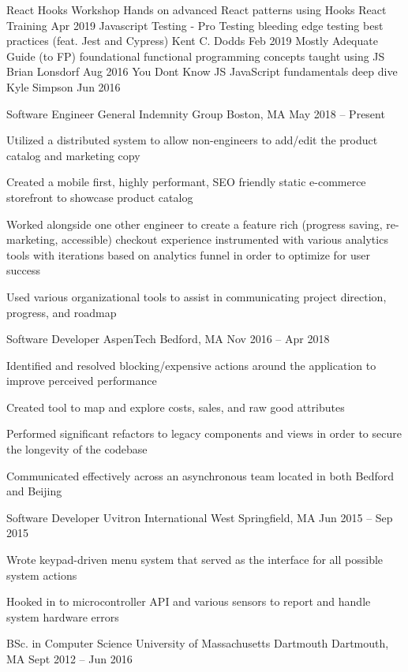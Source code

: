 \documentclass[]{awesome-cv}
\begin{document}
\vspace{-7mm}
\begin{cvhonors}
	\cvhonor
	{React Hooks Workshop}
	{Hands on advanced React patterns using Hooks}
	{React Training}
	{Apr 2019}
	\cvhonor
	{Javascript Testing - Pro Testing}
	{bleeding edge testing best practices (feat. Jest and Cypress)}
	{Kent C. Dodds}
	{Feb 2019}
	\cvhonor
	{Mostly Adequate Guide (to FP)}
	{foundational functional programming concepts taught using JS}
	{Brian Lonsdorf}
	{Aug 2016}
	\cvhonor
	{You Don\textquotesingle{}t Know JS}
	{JavaScript fundamentals deep dive}
	{Kyle Simpson}
	{Jun 2016}
\end{cvhonors}
\begin{cventries}
	\cventry
	{Software Engineer}
	{General Indemnity Group}
	{Boston, MA}
	{May 2018 – Present}
	{\begin{cvitems}
		\item {Utilized a distributed system to allow non-engineers to add/edit the product catalog and marketing copy}
		\item {Created a mobile first, highly performant, SEO friendly static e-commerce storefront to showcase product catalog}
		\item {Worked alongside one other engineer to create a feature rich (progress saving, re-marketing, accessible) checkout experience instrumented with various analytics tools with iterations based on analytics funnel in order to optimize for user success}
		\item {Used various organizational tools to assist in communicating project direction, progress, and roadmap}
		\end{cvitems}}
	\cventry
	{Software Developer}
	{AspenTech}
	{Bedford, MA}
	{Nov 2016 – Apr 2018}
	{\begin{cvitems}
		\item {Identified and resolved blocking/expensive actions around the application to improve perceived performance}
		\item {Created tool to map and explore costs, sales, and raw good attributes}
		\item {Performed significant refactors to legacy components and views in order to secure the longevity of the codebase}
		\item {Communicated effectively across an asynchronous team located in both Bedford and Beijing}
		\end{cvitems}}
	\cventry
	{Software Developer}
	{Uvitron International}
	{West Springfield, MA}
	{Jun 2015 – Sep 2015}
	{\begin{cvitems}
		\item {Wrote keypad-driven menu system that served as the interface for all possible system actions}
		\item {Hooked in to microcontroller API and various sensors to report and handle system hardware errors}
		\end{cvitems}}
\end{cventries}
\begin{cventries}
	\cventry
	{BSc. in Computer Science}
	{University of Massachusetts Dartmouth}
	{Dartmouth, MA}
	{Sept 2012 – Jun 2016}
	{}
\end{cventries}

\vspace{-2mm}
\ 
\end{document}
